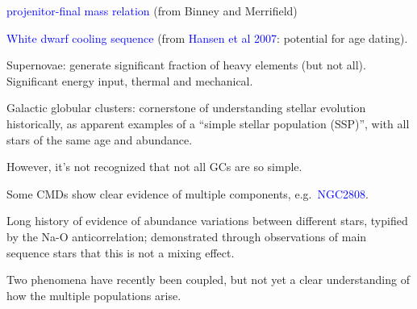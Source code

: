 \documentclass[12pt]{article}
\begin{document}
\begin{itemize*}
        \begin{itemize*}
            \item \textcolor{blue}{projenitor-final mass relation}
                (from Binney and Merrifield)
            \item \textcolor{blue}{White dwarf cooling sequence}
                (from \textcolor{blue}{Hansen et al 2007}: potential for
                age dating).
            \item Supernovae: generate significant fraction of heavy elements
                (but not all). Significant energy input, thermal and mechanical.
        \end{itemize*}
    \item Galactic globular clusters: cornerstone of understanding
      stellar evolution historically, as apparent examples of a
      ``simple stellar population (SSP)'', with all stars of the same
      age and abundance.
      \begin{itemize*}
          \item However, it's not recognized that not all GCs are so simple.
          \item Some CMDs show clear evidence of multiple components, e.g.\
              \textcolor{blue}{NGC2808}.
          \item Long history of evidence of abundance variations between
              different stars, typified by the Na-O anticorrelation;
              demonstrated through observations of main sequence stars that
              this is not a mixing effect.
          \item Two phenomena have recently been coupled, but not yet a clear
              understanding of how the multiple populations arise.
      \end{itemize*}
  \end{itemize*}
\end{document}
